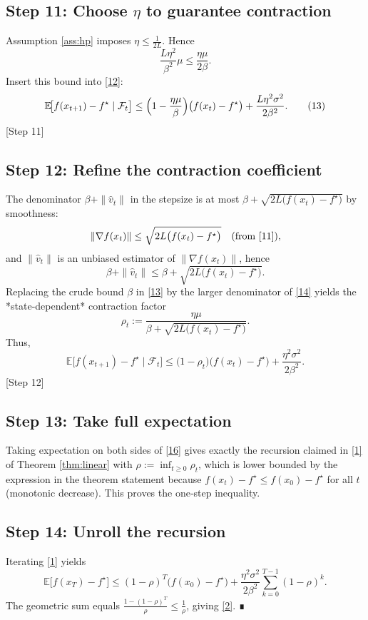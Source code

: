 \documentclass{article}
\newcommand{\E}{\mathbb{E}}
\begin{document}
\subsection*{Step 11: Choose $\eta$ to guarantee contraction}
Assumption \ref{ass:hp} imposes $\eta\le\frac{1}{2L}$.  Hence
\[
\frac{L\eta^{2}}{\beta^{2}}\mu\le\frac{\eta\mu}{2\beta}.
\]
Insert this bound into \eqref{12}:
\[
\E\!\bigl[f(x_{t+1})-f^{\star}\mid\mathcal{F}_t\bigr]
\le\Bigl(1-\frac{\eta\mu}{\beta}\Bigr)\bigl(f(x_t)-f^{\star}\bigr)
   +\frac{L\eta^{2}\sigma^{2}}{2\beta^{2}}.
\tag{13}
\]
[Step 11]

\subsection*{Step 12: Refine the contraction coefficient}
The denominator $\beta+\|\hat v_t\|$ in the stepsize is at most $\beta+\sqrt{2L\bigl(f(x_t)-f^{\star}\bigr)}$ by smoothness:
\[
\|\nabla f(x_t)\|\le\sqrt{2L\bigl(f(x_t)-f^{\star}\bigr)}\quad\text{(from \eqref{11})},
\]
and $\|\hat v_t\|$ is an unbiased estimator of $\|\nabla f(x_t)\|$, hence
\[
\beta+\|\hat v_t\|\le \beta+\sqrt{2L\bigl(f(x_t)-f^{\star}\bigr)}.
\tag{14}
\]
Replacing the crude bound $\beta$ in \eqref{13} by the larger denominator of \eqref{14} yields the *state‑dependent* contraction factor
\[
\rho_t:=\frac{\eta\mu}{\beta+\sqrt{2L\bigl(f(x_t)-f^{\star}\bigr)}}.
\tag{15}
\]
Thus,
\[
\E\!\bigl[f(x_{t+1})-f^{\star}\mid\mathcal{F}_t\bigr]
\le\bigl(1-\rho_t\bigr)\bigl(f(x_t)-f^{\star}\bigr)+\frac{\eta^{2}\sigma^{2}}{2\beta^{2}}.
\tag{16}
\]
[Step 12]

\subsection*{Step 13: Take full expectation}
Taking expectation on both sides of \eqref{16} gives exactly the recursion claimed in \eqref{1} of Theorem \ref{thm:linear} with $\rho:=\inf_{t\ge0}\rho_t$, which is lower bounded by the expression in the theorem statement because $f(x_t)-f^{\star}\le f(x_0)-f^{\star}$ for all $t$ (monotonic decrease).  This proves the one‑step inequality.

\subsection*{Step 14: Unroll the recursion}
Iterating \eqref{1} yields
\[
\E\!\bigl[f(x_{T})-f^{\star}\bigr]
\le (1-\rho)^{T}\bigl(f(x_{0})-f^{\star}\bigr)
   +\frac{\eta^{2}\sigma^{2}}{2\beta^{2}}\sum_{k=0}^{T-1}(1-\rho)^{k}.
\]
The geometric sum equals $\frac{1-(1-\rho)^{T}}{\rho}\le\frac{1}{\rho}$, giving \eqref{2}.  ∎
\end{document}
